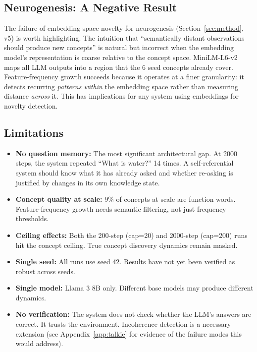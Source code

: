 \documentclass[conference]{IEEEtran}
\begin{document}
\subsection{Neurogenesis: A Negative Result}

The failure of embedding-space novelty for neurogenesis (Section~\ref{sec:method}, v5) is worth highlighting. The intuition that ``semantically distant observations should produce new concepts'' is natural but incorrect when the embedding model's representation is coarse relative to the concept space. MiniLM-L6-v2 maps all LLM outputs into a region that the 6 seed concepts already cover. Feature-frequency growth succeeds because it operates at a finer granularity: it detects recurring \emph{patterns within} the embedding space rather than measuring distance \emph{across} it. This has implications for any system using embeddings for novelty detection.

\subsection{Limitations}

\begin{itemize}[leftmargin=*]
\item \textbf{No question memory:} The most significant architectural gap. At 2000 steps, the system repeated ``What is water?'' 14 times. A self-referential system should know what it has already asked and whether re-asking is justified by changes in its own knowledge state.
\item \textbf{Concept quality at scale:} 9\% of concepts at scale are function words. Feature-frequency growth needs semantic filtering, not just frequency thresholds.
\item \textbf{Ceiling effects:} Both the 200-step (cap=20) and 2000-step (cap=200) runs hit the concept ceiling. True concept discovery dynamics remain masked.
\item \textbf{Single seed:} All runs use seed 42. Results have not yet been verified as robust across seeds.
\item \textbf{Single model:} Llama 3 8B only. Different base models may produce different dynamics.
\item \textbf{No verification:} The system does not check whether the LLM's answers are correct. It trusts the environment. Incoherence detection is a necessary extension (see Appendix~\ref{app:talkie} for evidence of the failure modes this would address).
\end{itemize}
\end{document}
